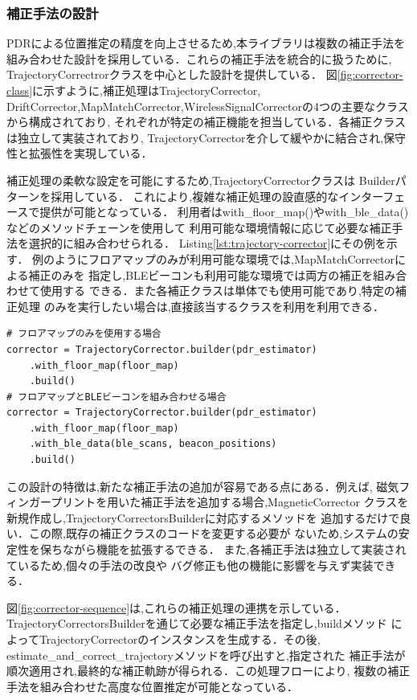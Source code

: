 
\subsubsection{補正手法の設計}

PDRによる位置推定の精度を向上させるため,本ライブラリは複数の補正手法を
組み合わせた設計を採用している．これらの補正手法を統合的に扱うために,
TrajectoryCorrectrorクラスを中心とした設計を提供している．
図\ref{fig:corrector-class}に示すように,補正処理はTrajectoryCorrector,
DriftCorrector,MapMatchCorrector,WirelessSignalCorrectorの4つの主要なクラスから構成されており,
それぞれが特定の補正機能を担当している．各補正クラスは独立して実装されており,
TrajectoryCorrectorを介して緩やかに結合され,保守性と拡張性を実現している．

補正処理の柔軟な設定を可能にするため,TrajectoryCorrectorクラスは
Builderパターンを採用している．
これにより,複雑な補正処理の設直感的なインターフェースで提供が可能となっている．
利用者はwith\_floor\_map()やwith\_ble\_data()などのメソッドチェーンを使用して
利用可能な環境情報に応じて必要な補正手法を選択的に組み合わせられる．
Listing\ref{lst:trajectory-corrector}にその例を示す．
例のようにフロアマップのみが利用可能な環境では,MapMatchCorrectorによる補正のみを
指定し,BLEビーコンも利用可能な環境では両方の補正を組み合わせて使用する
できる．また各補正クラスは単体でも使用可能であり,特定の補正処理
のみを実行したい場合は,直接該当するクラスを利用を利用できる．

\begin{lstlisting}[caption={TrajectoryCorrectorの使用例},label=lst:trajectory-corrector,float=h]
# フロアマップのみを使用する場合
corrector = TrajectoryCorrector.builder(pdr_estimator)
    .with_floor_map(floor_map)
    .build()
# フロアマップとBLEビーコンを組み合わせる場合
corrector = TrajectoryCorrector.builder(pdr_estimator)
    .with_floor_map(floor_map)
    .with_ble_data(ble_scans, beacon_positions)
    .build()
\end{lstlisting}

この設計の特徴は,新たな補正手法の追加が容易である点にある．例えば,
磁気フィンガープリントを用いた補正手法を追加する場合,MagneticCorrector
クラスを新規作成し,TrajectoryCorrectorsBuilderに対応するメソッドを
追加するだけで良い．この際,既存の補正クラスのコードを変更する必要が
ないため,システムの安定性を保ちながら機能を拡張するできる．
また,各補正手法は独立して実装されているため,個々の手法の改良や
バグ修正も他の機能に影響を与えず実装できる．

図\ref{fig:corrector-sequence}は,これらの補正処理の連携を示している．
TrajectoryCorrectorsBuilderを通じて必要な補正手法を指定し,buildメソッド
によってTrajectoryCorrectorのインスタンスを生成する．その後,
estimate\_and\_correct\_trajectoryメソッドを呼び出すと,指定された
補正手法が順次適用され,最終的な補正軌跡が得られる．この処理フローにより,
複数の補正手法を組み合わせた高度な位置推定が可能となっている．

